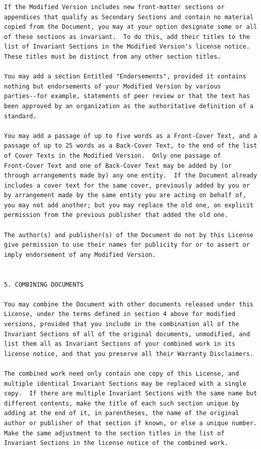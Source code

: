\documentclass[a4paper]{report}
\begin{document}
\begin{verbatim}
If the Modified Version includes new front-matter sections or
appendices that qualify as Secondary Sections and contain no material
copied from the Document, you may at your option designate some or all
of these sections as invariant.  To do this, add their titles to the
list of Invariant Sections in the Modified Version's license notice.
These titles must be distinct from any other section titles.

You may add a section Entitled "Endorsements", provided it contains
nothing but endorsements of your Modified Version by various
parties--for example, statements of peer review or that the text has
been approved by an organization as the authoritative definition of a
standard.

You may add a passage of up to five words as a Front-Cover Text, and a
passage of up to 25 words as a Back-Cover Text, to the end of the list
of Cover Texts in the Modified Version.  Only one passage of
Front-Cover Text and one of Back-Cover Text may be added by (or
through arrangements made by) any one entity.  If the Document already
includes a cover text for the same cover, previously added by you or
by arrangement made by the same entity you are acting on behalf of,
you may not add another; but you may replace the old one, on explicit
permission from the previous publisher that added the old one.

The author(s) and publisher(s) of the Document do not by this License
give permission to use their names for publicity for or to assert or
imply endorsement of any Modified Version.


5. COMBINING DOCUMENTS

You may combine the Document with other documents released under this
License, under the terms defined in section 4 above for modified
versions, provided that you include in the combination all of the
Invariant Sections of all of the original documents, unmodified, and
list them all as Invariant Sections of your combined work in its
license notice, and that you preserve all their Warranty Disclaimers.

The combined work need only contain one copy of this License, and
multiple identical Invariant Sections may be replaced with a single
copy.  If there are multiple Invariant Sections with the same name but
different contents, make the title of each such section unique by
adding at the end of it, in parentheses, the name of the original
author or publisher of that section if known, or else a unique number.
Make the same adjustment to the section titles in the list of
Invariant Sections in the license notice of the combined work.


\end{verbatim}
\end{document}
